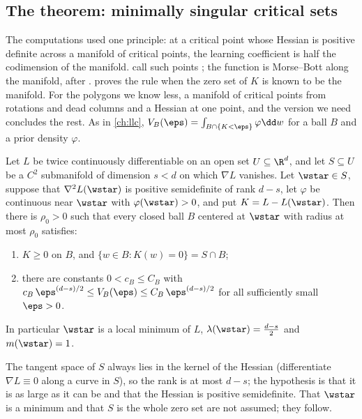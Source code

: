 \begin{refsection}
\section{The theorem: minimally singular critical sets}\label{sec:stages:theorem}

The computations used one principle: at a critical point whose Hessian is positive definite across a manifold of critical points, the learning coefficient is half the codimension of the manifold. \textcite{WeiEtAl2023} call such points ; the function is Morse--Bott along the manifold, after \textcite{Bott1954}.  proves the rule when the zero set of $K$ is known to be the manifold. For the polygons we know less, a manifold of critical points from rotations and dead columns and a Hessian at one point, and the version we need concludes the rest. As in \cref{ch:llc}, $V_B(\eps)=\int_{B\cap\{K<\eps\}}\varphi\dd w$ for a ball $B$ and a prior density $\varphi$.

\begin{theorem}\label{thm:stages:minimal}
Let $L$ be twice continuously differentiable on an open set $U\subseteq\R^d$, and let $S\subseteq U$ be a $C^2$ submanifold of dimension $s<d$ on which $\nabla L$ vanishes. Let $\wstar\in S$, suppose that $\nabla^2L(\wstar)$ is positive semidefinite of rank $d-s$, let $\varphi$ be continuous near $\wstar$ with $\varphi(\wstar)>0$, and put $K=L-L(\wstar)$. Then there is $\rho_0>0$ such that every closed ball $B$ centered at $\wstar$ with radius at most $\rho_0$ satisfies:
\begin{enumerate}[label=(\roman*)]
\item $K\ge0$ on $B$, and $\{w\in B:K(w)=0\}=S\cap B$;
\item there are constants $0<c_B\le C_B$ with $c_B\,\eps^{(d-s)/2}\le V_B(\eps)\le C_B\,\eps^{(d-s)/2}$ for all sufficiently small $\eps>0$.
\end{enumerate}
In particular $\wstar$ is a local minimum of $L$, $\lambda(\wstar)=\frac{d-s}2$ and $m(\wstar)=1$.
\end{theorem}

The tangent space of $S$ always lies in the kernel of the Hessian (differentiate $\nabla L\equiv0$ along a curve in $S$), so the rank is at most $d-s$; the hypothesis is that it is as large as it can be and that the Hessian is positive semidefinite. That $\wstar$ is a minimum and that $S$ is the whole zero set are not assumed; they follow.


\end{refsection}
